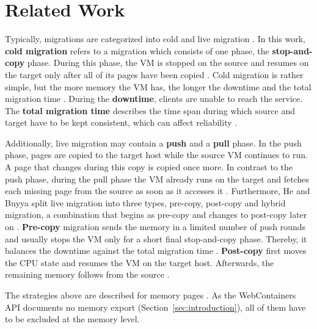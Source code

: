 \section{Related Work}
\label{sec:related-work}

Typically, migrations are categorized into cold and live migration \cite{he2023taxonomy}.
In this work, \textbf{cold migration} refers to a migration which consists of one phase, the \textbf{stop-and-copy} phase. During this phase, the \ac{VM} is stopped on the source and resumes on the target only after all of its pages have been copied \cite{clark2005live}.
Cold migration is rather simple, but the more memory the \ac{VM} has, the longer the downtime and the total migration time \cite{clark2005live,he2023taxonomy}. During the \textbf{downtime}, clients are unable to reach the service. The \textbf{total migration time} describes the time span during which source and target have to be kept consistent, which can affect reliability \cite{clark2005live}.

Additionally, live migration may contain a \textbf{push} and a \textbf{pull} phase. In the push phase, pages are copied to the target host while the source \ac{VM} continues to run. A page that changes during this copy is copied once more. In contrast to the push phase, during the pull phase the \ac{VM} already runs on the target and fetches each missing page from the source as soon as it accesses it \cite{clark2005live,he2023taxonomy}.
Furthermore, He and Buyya split live migration into three types, pre-copy, post-copy and hybrid migration, a combination that begins as pre-copy and changes to post-copy later on \cite{he2023taxonomy}.
\textbf{Pre-copy} migration sends the memory in a limited number of push rounds and usually stops the \ac{VM} only for a short final stop-and-copy phase. Thereby, it balances the downtime against the total migration time \cite{clark2005live}.
\textbf{Post-copy} first moves the \ac{CPU} state and resumes the \ac{VM} on the target host. Afterwards, the remaining memory follows from the source \cite{hines2009post,he2023taxonomy}.

The strategies above are described for memory pages \cite{he2023taxonomy}. As the WebContainers \ac{API} documents no memory export (Section~\ref{sec:introduction}), all of them have to be excluded at the memory level.

